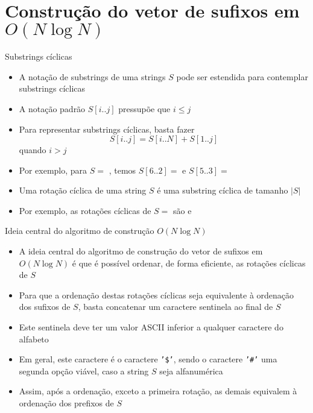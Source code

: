 \section{Construção do vetor de sufixos em $O(N\log N)$}

\begin{frame}[fragile]{Substrings cíclicas}

    \begin{itemize}
        \item A notação de substrings de uma strings $S$ pode ser estendida para contemplar
            substrings cíclicas

        \item A notação padrão $S[i..j]$ pressupõe que $i \leq j$

        \item Para representar substrings cíclicas, basta fazer
        \[
            S[i..j] = S[i..N] + S[1..j]
        \]
        quando $i > j$

        \item Por exemplo, para $S = $ , temos $S[6..2] = $ 
            e $S[5..3] =$ 

        \item Uma rotação cíclica de uma string $S$ é uma substring cíclica de tamanho $|S|$

        \item Por exemplo, as rotações cíclicas de $S = $  são 
             e 
    \end{itemize}

\end{frame}

\begin{frame}[fragile]{Ideia central do algoritmo de construção $O(N\log N)$}

    \begin{itemize}
        \item A ideia central do algoritmo de construção do vetor de sufixos em $O(N\log N)$ é
            que é possível ordenar, de forma eficiente, as rotações cíclicas de $S$

        \item Para que a ordenação destas rotações cíclicas seja equivalente à ordenação dos
            sufixos de $S$, basta concatenar um caractere sentinela ao final de $S$

        \item Este sentinela deve ter um valor ASCII inferior a qualquer caractere do alfabeto

        \item Em geral, este caractere é o caractere \texttt{'\$'}, sendo o caractere 
            \texttt{'\#'} uma segunda opção viável, caso a string $S$ seja alfanumérica

        \item Assim, após a ordenação, exceto a primeira rotação, as demais equivalem à 
            ordenação dos prefixos de $S$
    \end{itemize}

\end{frame}

